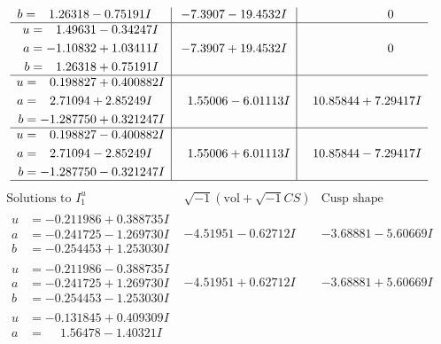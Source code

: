 \documentclass[1p]{elsarticle_modified}
\theoremstyle{definition}
\newcommand{\I}{\sqrt{-1}}
\begin{document}
$$\begin{array}{c|c|c}
\begin{aligned}
b &= \phantom{-}1.26318 - 0.75191 I\end{aligned}
 & -7.3907 - 19.4532 I & \phantom{-0.000000 } 0 \\ \hline\begin{aligned}
u &= \phantom{-}1.49631 - 0.34247 I \\
a &= -1.10832 + 1.03411 I \\
b &= \phantom{-}1.26318 + 0.75191 I\end{aligned}
 & -7.3907 + 19.4532 I & \phantom{-0.000000 } 0 \\ \hline\begin{aligned}
u &= \phantom{-}0.198827 + 0.400882 I \\
a &= \phantom{-}2.71094 + 2.85249 I \\
b &= -1.287750 + 0.321247 I\end{aligned}
 & \phantom{-}1.55006 - 6.01113 I & \phantom{-}10.85844 + 7.29417 I \\ \hline\begin{aligned}
u &= \phantom{-}0.198827 - 0.400882 I \\
a &= \phantom{-}2.71094 - 2.85249 I \\
b &= -1.287750 - 0.321247 I\end{aligned}
 & \phantom{-}1.55006 + 6.01113 I & \phantom{-}10.85844 - 7.29417 I\\
 \hline 
 \end{array}$$\newpage$$\begin{array}{c|c|c}  
\text{Solutions to }I^u_{1}& \I (\text{vol} + \sqrt{-1}CS) & \text{Cusp shape}\\
 \hline 
\begin{aligned}
u &= -0.211986 + 0.388735 I \\
a &= -0.241725 - 1.269730 I \\
b &= -0.254453 + 1.253030 I\end{aligned}
 & -4.51951 - 0.62712 I & -3.68881 - 5.60669 I \\ \hline\begin{aligned}
u &= -0.211986 - 0.388735 I \\
a &= -0.241725 + 1.269730 I \\
b &= -0.254453 - 1.253030 I\end{aligned}
 & -4.51951 + 0.62712 I & -3.68881 + 5.60669 I \\ \hline\begin{aligned}
u &= -0.131845 + 0.409309 I \\
a &= \phantom{-}1.56478 - 1.40321 I \\

\end{aligned}
\end{array}$$
\end{document}

